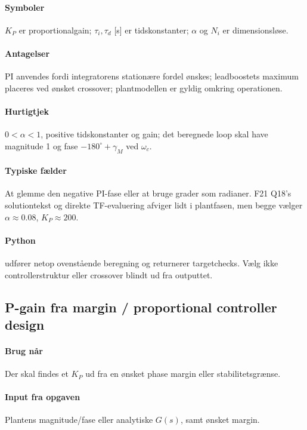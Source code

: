 \paragraph{Symboler}
\(K_P\) er proportionalgain; \(\tau_i,\tau_d\) [s] er tidskonstanter;
\(\alpha\) og \(N_i\) er dimensionsløse.

\paragraph{Antagelser}
PI anvendes fordi integratorens stationære fordel ønskes; leadboostets maximum
placeres ved ønsket crossover; plantmodellen er gyldig omkring operationen.

\paragraph{Hurtigtjek}
\(0<\alpha<1\), positive tidskonstanter og gain; det beregnede loop skal have
magnitude 1 og fase \(-180^\circ+\gamma_M\) ved \(\omega_c\).

\paragraph{Typiske fælder}
At glemme den negative PI-fase eller at bruge grader som radianer. F21 Q18's
solutiontekst og direkte TF-evaluering afviger lidt i plantfasen, men begge vælger
\(\alpha\approx0.08\), \(K_P\approx200\).

\paragraph{Python}
udfører netop ovenstående beregning og returnerer targetchecks. Vælg ikke controllerstruktur
eller crossover blindt ud fra outputtet.

\subsection{P-gain fra margin / proportional controller design}

\paragraph{Brug når}
Der skal findes et \(K_P\) ud fra en ønsket phase margin eller stabilitetsgrænse.

\paragraph{Input fra opgaven}
Plantens magnitude/fase eller analytiske \(G(s)\), samt ønsket margin.

